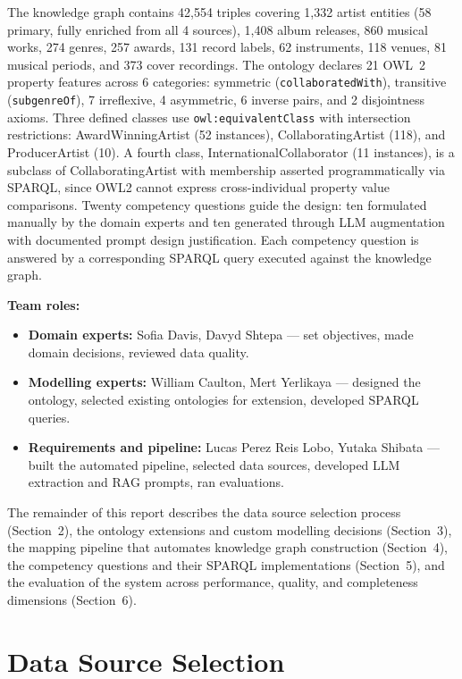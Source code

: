 \documentclass[11pt,a4paper]{article}
\begin{document}
The knowledge graph contains 42,554 triples covering 1,332 artist entities (58 primary, fully enriched from all 4 sources), 1,408 album releases, 860 musical works, 274 genres, 257 awards, 131 record labels, 62 instruments, 118 venues, 81 musical periods, and 373 cover recordings. The ontology declares 21 OWL~2 property features across 6 categories: symmetric (\texttt{collaboratedWith}), transitive (\texttt{subgenreOf}), 7 irreflexive, 4 asymmetric, 6 inverse pairs, and 2 disjointness axioms. Three defined classes use \texttt{owl:equivalentClass} with intersection restrictions: AwardWinningArtist (52 instances), CollaboratingArtist (118), and ProducerArtist (10). A fourth class, InternationalCollaborator (11 instances), is a subclass of CollaboratingArtist with membership asserted programmatically via SPARQL, since OWL2 cannot express cross-individual property value comparisons. Twenty competency questions guide the design: ten formulated manually by the domain experts and ten generated through LLM augmentation with documented prompt design justification. Each competency question is answered by a corresponding SPARQL query executed against the knowledge graph.

\textbf{Team roles:}
\begin{itemize}[nosep]
  \item \textbf{Domain experts:} Sofia Davis, Davyd Shtepa --- set objectives, made domain decisions, reviewed data quality.
  \item \textbf{Modelling experts:} William Caulton, Mert Yerlikaya --- designed the ontology, selected existing ontologies for extension, developed SPARQL queries.
  \item \textbf{Requirements and pipeline:} Lucas Perez Reis Lobo, Yutaka Shibata --- built the automated pipeline, selected data sources, developed LLM extraction and RAG prompts, ran evaluations.
\end{itemize}

The remainder of this report describes the data source selection process (Section~2), the ontology extensions and custom modelling decisions (Section~3), the mapping pipeline that automates knowledge graph construction (Section~4), the competency questions and their SPARQL implementations (Section~5), and the evaluation of the system across performance, quality, and completeness dimensions (Section~6).

\section{Data Source Selection}
\end{document}
